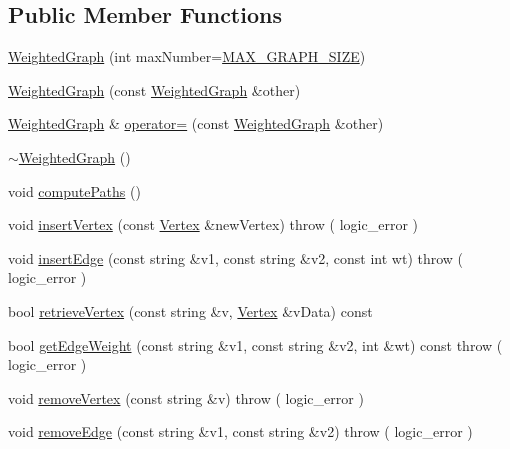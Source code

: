\subsection*{\-Public \-Member \-Functions}
\begin{DoxyCompactItemize}
\item 
\hyperlink{class_weighted_graph_a9255d382e53db8d520ef1e2b63814c81}{\-Weighted\-Graph} (int max\-Number=\hyperlink{class_weighted_graph_af9b34017e5b494cd3aca2dbc8335fc3c}{\-M\-A\-X\-\_\-\-G\-R\-A\-P\-H\-\_\-\-S\-I\-Z\-E})
\item 
\hyperlink{class_weighted_graph_a294fd717db213e761dc0eb65bbfcb7ab}{\-Weighted\-Graph} (const \hyperlink{class_weighted_graph}{\-Weighted\-Graph} \&other)
\item 
\hyperlink{class_weighted_graph}{\-Weighted\-Graph} \& \hyperlink{class_weighted_graph_aa5982a507e944af28e4749cdc06543c6}{operator=} (const \hyperlink{class_weighted_graph}{\-Weighted\-Graph} \&other)
\item 
\hyperlink{class_weighted_graph_ad7b4a5c8206772f9f4fb5906c0d64923}{$\sim$\-Weighted\-Graph} ()
\item 
void \hyperlink{class_weighted_graph_aeaea1bd5b1e14b69f2155613bfd25d68}{compute\-Paths} ()
\item 
void \hyperlink{class_weighted_graph_aec4ef3455e3cc0d73a42e042adb7ac40}{insert\-Vertex} (const \hyperlink{class_weighted_graph_1_1_vertex}{\-Vertex} \&new\-Vertex)  throw ( logic\-\_\-error )
\item 
void \hyperlink{class_weighted_graph_a8be8442a104f3c411f6b1bb072fa97b1}{insert\-Edge} (const string \&v1, const string \&v2, const int wt)  throw ( logic\-\_\-error )
\item 
bool \hyperlink{class_weighted_graph_a3afabc2236c99dac950f5161f715f114}{retrieve\-Vertex} (const string \&v, \hyperlink{class_weighted_graph_1_1_vertex}{\-Vertex} \&v\-Data) const 
\item 
bool \hyperlink{class_weighted_graph_ab136044e7378313087be69eb43e7f042}{get\-Edge\-Weight} (const string \&v1, const string \&v2, int \&wt) const   throw ( logic\-\_\-error )
\item 
void \hyperlink{class_weighted_graph_abaaa572a9b1a60ec3cd99d8db9d9590e}{remove\-Vertex} (const string \&v)  throw ( logic\-\_\-error )
\item 
void \hyperlink{class_weighted_graph_a1db455249fa7fedf70aa5683487a17df}{remove\-Edge} (const string \&v1, const string \&v2)  throw ( logic\-\_\-error )
\item 

\end{DoxyCompactItemize}
